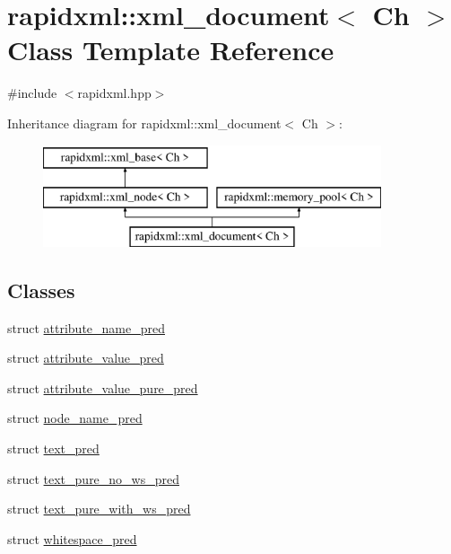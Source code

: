 \hypertarget{classrapidxml_1_1xml__document}{}\section{rapidxml\+:\+:xml\+\_\+document$<$ Ch $>$ Class Template Reference}
\label{classrapidxml_1_1xml__document}


{\ttfamily \#include $<$rapidxml.\+hpp$>$}

Inheritance diagram for rapidxml\+:\+:xml\+\_\+document$<$ Ch $>$\+:\begin{figure}[H]
\begin{center}
\leavevmode
\includegraphics[height=3.000000cm]{classrapidxml_1_1xml__document}
\end{center}
\end{figure}
\subsection*{Classes}
\begin{DoxyCompactItemize}
\item 
struct \hyperlink{structrapidxml_1_1xml__document_1_1attribute__name__pred}{attribute\+\_\+name\+\_\+pred}
\item 
struct \hyperlink{structrapidxml_1_1xml__document_1_1attribute__value__pred}{attribute\+\_\+value\+\_\+pred}
\item 
struct \hyperlink{structrapidxml_1_1xml__document_1_1attribute__value__pure__pred}{attribute\+\_\+value\+\_\+pure\+\_\+pred}
\item 
struct \hyperlink{structrapidxml_1_1xml__document_1_1node__name__pred}{node\+\_\+name\+\_\+pred}
\item 
struct \hyperlink{structrapidxml_1_1xml__document_1_1text__pred}{text\+\_\+pred}
\item 
struct \hyperlink{structrapidxml_1_1xml__document_1_1text__pure__no__ws__pred}{text\+\_\+pure\+\_\+no\+\_\+ws\+\_\+pred}
\item 
struct \hyperlink{structrapidxml_1_1xml__document_1_1text__pure__with__ws__pred}{text\+\_\+pure\+\_\+with\+\_\+ws\+\_\+pred}
\item 
struct \hyperlink{structrapidxml_1_1xml__document_1_1whitespace__pred}{whitespace\+\_\+pred}
\end{DoxyCompactItemize}
